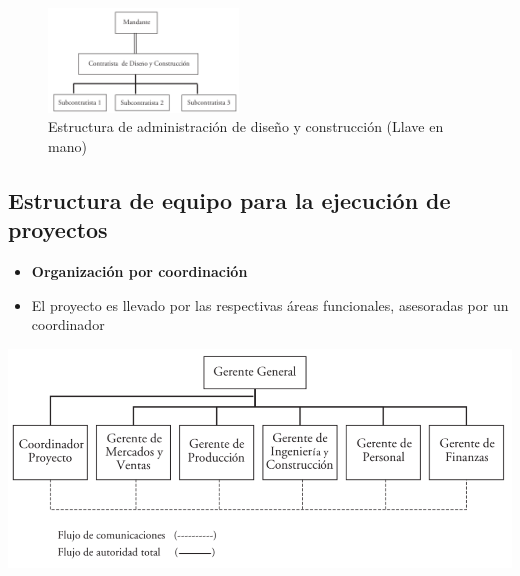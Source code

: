 \documentclass{article} %
\begin{document}
\begin{figure}[h!]
    \centering
    \includegraphics[width=0.45\textwidth]{dis_cons_rel.png}
    \caption{Estructura de administración de diseño y construcción (Llave en mano)} 
    \label{fig:estructura_organizacionales}
\end{figure}

\newpage

\subsection{Estructura de equipo para la ejecución de proyectos}
\begin{minipage}{0.45\textwidth}
    \begin{itemize}
        \item \textbf{Organización por coordinación}
        \item El proyecto es llevado por las respectivas áreas funcionales, asesoradas por un coordinador
    \end{itemize}
\end{minipage}
\hfill
\begin{minipage}{0.5\textwidth}
    \centering
    \includegraphics[width=1.2\textwidth]{Arbol_org_proyecto.png}
\end{minipage}
\end{document}
